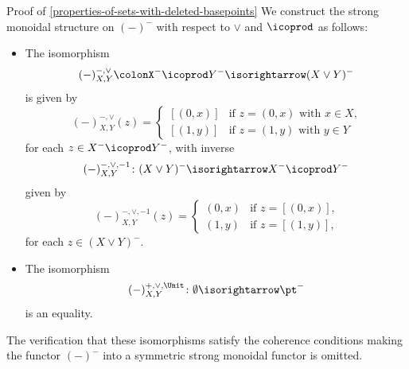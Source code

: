 \begin{Proof}{Proof of \cref{properties-of-sets-with-deleted-basepoints}}
    We construct the strong monoidal structure on $(-)^{-}$ with respect to $\vee$ and $\icoprod$ as follows:
    \begin{itemize}
        \item{}The isomorphism
            \[
                (-)^{-,\vee}_{X,Y}%
                \colon%
                X^{-}\icoprod Y^{-}%
                \isorightarrow
                (X\vee Y)^{-}
            \]%
            is given by
            \[
                (-)^{-,\vee}_{X,Y}(z)%
                =%
                \begin{cases}%
                    [(0,x)] &\text{if $z=(0,x)$ with $x\in X$,}\\ %
                    [(1,y)] &\text{if $z=(1,y)$ with $y\in Y$}%
                \end{cases}%
            \]%
            for each $z\in X^{-}\icoprod Y^{-}$, with inverse
            \[
                (-)^{-,\vee,-1}_{X,Y}
                \colon%
                (X\vee Y)^{-}
                \isorightarrow
                X^{-}\icoprod Y^{-}%
            \]%
            given by
            \[
                (-)^{-,\vee,-1}_{X,Y}(z)%
                =%
                \begin{cases}
                    (0,x) &\text{if $z=[(0,x)]$,}\\
                    (1,y) &\text{if $z=[(1,y)]$,}
                \end{cases}
            \]%
            for each $z\in(X\vee Y)^{-}$.
        \item{}The isomorphism
            \[
                (-)^{+,\vee,\Unit}_{X,Y}%
                \colon%
                \emptyset%
                \isorightarrow
                \pt^{-}%
            \]%
            is an equality.
    \end{itemize}
    The verification that these isomorphisms satisfy the coherence conditions making the functor $(-)^{-}$ into a symmetric strong monoidal functor is omitted.


\end{Proof}
